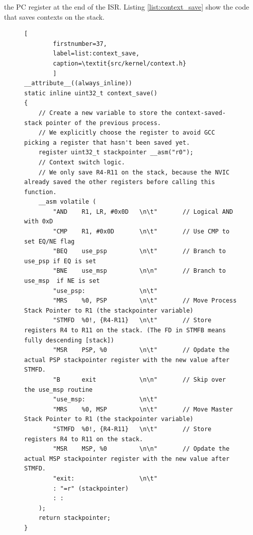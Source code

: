 the PC register at the end of the ISR. Listing \ref{list:context_save} show the
code that saves contexts on the stack.\\
\begin{figure}
\lstset{
	language=C,
	basicstyle=\footnotesize,
	showspaces=false,
	showtabs=false,
	showstringspaces=false,
	tabsize=4,
	breaklines=true
}
	\begin{lstlisting}[
		firstnumber=37,
		label=list:context_save,
		caption=\textit{src/kernel/context.h}
		]
__attribute__((always_inline))
static inline uint32_t context_save()
{
	// Create a new variable to store the context-saved-stack pointer of the previous process.
    // We explicitly choose the register to avoid GCC picking a register that hasn't been saved yet.
	register uint32_t stackpointer __asm("r0");
	// Context switch logic.
    // We only save R4-R11 on the stack, because the NVIC already saved the other registers before calling this function.
    __asm volatile (
        "AND	R1, LR, #0x0D	\n\t"		// Logical AND with 0xD
        "CMP    R1, #0x0D		\n\t"		// Use CMP to set EQ/NE flag
        "BEQ    use_psp			\n\t"		// Branch to use_psp if EQ is set
        "BNE    use_msp		 	\n\n"		// Branch to use_msp  if NE is set
        "use_psp:				\n\t"
        "MRS    %0, PSP			\n\t"		// Move Process Stack Pointer to R1 (the stackpointer variable)
        "STMFD  %0!, {R4-R11}   \n\t"		// Store registers R4 to R11 on the stack. (The FD in STMFB means fully descending [stack])
        "MSR    PSP, %0         \n\t"		// Opdate the actual PSP stackpointer register with the new value after STMFD.
        "B      exit			\n\n"		// Skip over the use_msp routine
        "use_msp:				\n\t"
        "MRS    %0, MSP			\n\t"		// Move Master Stack Pointer to R1 (the stackpointer variable)
        "STMFD  %0!, {R4-R11}   \n\t"		// Store registers R4 to R11 on the stack.
        "MSR    MSP, %0         \n\n"		// Opdate the actual MSP stackpointer register with the new value after STMFD.
        "exit:                  \n\t"
        : "=r" (stackpointer)
        : :
    );
    return stackpointer;
}
	\end{lstlisting}
\end{figure}


